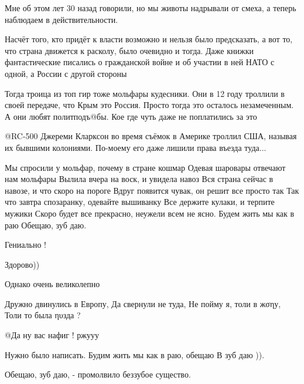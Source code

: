 \begin{itemize}
\begin{itemize} %

Мне об этом лет 30 назад говорили, но мы животы надрывали от смеха, а теперь
наблюдаем в действительности.


Насчёт того, кто придёт к власти возможно и нельзя было предсказать, а вот то, что
страна движется к расколу, было очевидно и тогда. Даже книжки фантастические
писались о гражданской войне и об участии в ней НАТО с одной, а России с другой
стороны


Тогда троица из топ гир тоже мольфары кудесники. Они в 12 году троллили в своей
передаче, что Крым это Россия. Просто тогда это осталось незамеченным. А они
любят политподъ@бы. Кое где чуть даже не поплатились за это


@RC-500  Джереми Кларксон во время съёмок в Америке троллил США, называя их
бывшими колониями. По-моему его даже лишили права въезда туда...
\end{itemize} %


Мы спросили у мольфар, почему в стране кошмар
Одевая шаровары отвечают нам мольфары 
Вылила вчера на воск, и увидела навоз 
Вся страна сейчас в навозе, и что скоро на пороге
Вдруг появится чувак, он решит все просто так
Так что завтра спозаранку, одевайте вышиванку 
Все держите кулаки, и терпите мужики
Скоро будет все прекрасно, неужели всем не ясно. 
Будем жить мы как в раю 
Обещаю, зуб даю.

\begin{itemize} %

Гениально !

Здорово))

Однако очень великолепно


Дружно двинулись в Европу, Да свернули не туда, Не пойму я, толи в жσηу, Толи то была ηυзда ?

@Да ну вас нафиг !  ржууу

Нужно было написать. Будим жить мы как в раю, обещаю В зуб даю )).

Обещаю, зуб даю, - промолвило беззубое существо.


\end{itemize}
\end{itemize}
